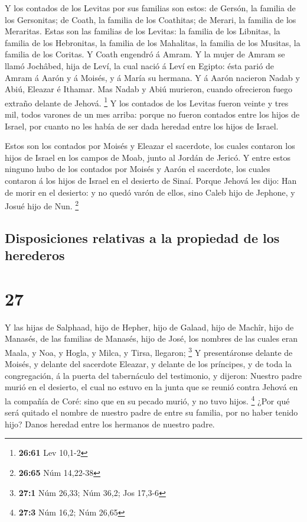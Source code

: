  Y los contados de los Levitas por sus familias son estos:
de Gersón, la familia de los Gersonitas; de Coath, la familia de los
Coathitas; de Merari, la familia de los Meraritas.  Estas
son las familias de los Levitas: la familia de los Libnitas, la familia
de los Hebronitas, la familia de los Mahalitas, la familia de los
Musitas, la familia de los Coritas. Y Coath engendró á Amram.
 Y la mujer de Amram se llamó Jochâbed, hija de Leví, la
cual nació á Leví en Egipto: ésta parió de Amram á Aarón y á Moisés, y á
María su hermana.  Y á Aarón nacieron Nadab y Abiú, Eleazar
é Ithamar.  Mas Nadab y Abiú murieron, cuando ofrecieron
fuego extraño delante de Jehová. \footnote{\textbf{26:61} Lev 10,1-2}
 Y los contados de los Levitas fueron veinte y tres mil,
todos varones de un mes arriba: porque no fueron contados entre los
hijos de Israel, por cuanto no les había de ser dada heredad entre los
hijos de Israel.

 Estos son los contados por Moisés y Eleazar el sacerdote,
los cuales contaron los hijos de Israel en los campos de Moab, junto al
Jordán de Jericó.  Y entre estos ninguno hubo de los
contados por Moisés y Aarón el sacerdote, los cuales contaron á los
hijos de Israel en el desierto de Sinaí.  Porque Jehová les
dijo: Han de morir en el desierto: y no quedó varón de ellos, sino Caleb
hijo de Jephone, y Josué hijo de Nun. \footnote{\textbf{26:65} Núm
  14,22-38}

\hypertarget{disposiciones-relativas-a-la-propiedad-de-los-herederos}{%
\subsection{Disposiciones relativas a la propiedad de los
herederos}\label{disposiciones-relativas-a-la-propiedad-de-los-herederos}}

\hypertarget{section-26}{%
\section{27}\label{section-26}}

 Y las hijas de Salphaad, hijo de Hepher, hijo de Galaad,
hijo de Machîr, hijo de Manasés, de las familias de Manasés, hijo de
José, los nombres de las cuales eran Maala, y Noa, y Hogla, y Milca, y
Tirsa, llegaron; \footnote{\textbf{27:1} Núm 26,33; Núm 36,2; Jos 17,3-6}
 Y presentáronse delante de Moisés, y delante del sacerdote
Eleazar, y delante de los príncipes, y de toda la congregación, á la
puerta del tabernáculo del testimonio, y dijeron:  Nuestro
padre murió en el desierto, el cual no estuvo en la junta que se reunió
contra Jehová en la compañía de Coré: sino que en su pecado murió, y no
tuvo hijos. \footnote{\textbf{27:3} Núm 16,2; Núm 26,65} 
¿Por qué será quitado el nombre de nuestro padre de entre su familia,
por no haber tenido hijo? Danos heredad entre los hermanos de nuestro
padre.

